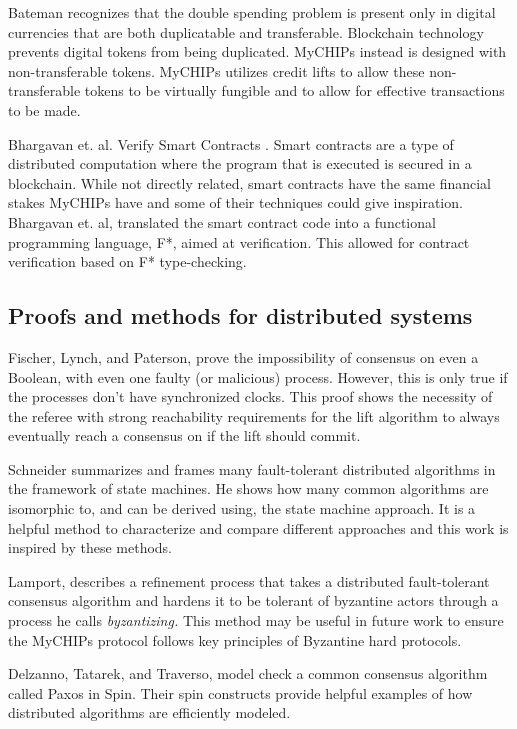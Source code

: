 \documentclass[runningheads]{llncs}
\begin{document}
 Bateman recognizes that the double spending problem is present only in digital currencies that are both duplicatable and transferable. Blockchain technology prevents digital tokens from being duplicated. MyCHIPs instead is designed with non-transferable tokens. MyCHIPs utilizes credit lifts to allow these non-transferable tokens to be virtually fungible and to allow for effective transactions to be made. 
 
 Bhargavan et. al. Verify Smart Contracts \cite{SmartContracts}. Smart contracts are a type of distributed computation where the program that is executed is secured in a blockchain. While not directly related, smart contracts have the same financial stakes MyCHIPs have and some of their techniques could give inspiration.  Bhargavan et. al, translated the smart contract code into a functional programming language, F*, aimed at verification. This allowed for contract verification based on F* type-checking.

 \subsection{Proofs and methods for distributed systems}
 Fischer, Lynch, and Paterson,\cite{Fischer} prove the impossibility of consensus on even a Boolean, with even one faulty (or malicious) process. However, this is only true if the processes don't have synchronized clocks. This proof shows the necessity of the referee with strong reachability requirements for the lift algorithm to always eventually reach a consensus on if the lift should commit.
 
 Schneider summarizes and frames many fault-tolerant distributed algorithms in the framework of state machines\cite{StateMachine}. He shows how many common algorithms are isomorphic to, and can be derived using, the state machine approach. It is a helpful method to characterize and compare different approaches and this work is inspired by these methods.
 
 Lamport\cite{Lamport}, describes a refinement process that takes a distributed fault-tolerant consensus algorithm and hardens it to be tolerant of byzantine actors through a process he calls \emph{byzantizing.} This method may be useful in future work to ensure the MyCHIPs protocol follows key principles of Byzantine hard protocols.
 
 Delzanno, Tatarek, and Traverso, model check a common consensus algorithm called Paxos in Spin. Their spin constructs provide helpful examples of how distributed algorithms are efficiently modeled.\cite{Delzanno_2014}
 
\end{document}
